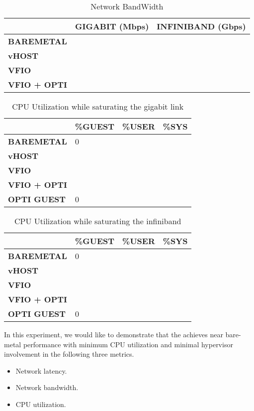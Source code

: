 \begin{table}
\begin{tabular}{|l|p{2cm}|p{2cm}|}
\hline
\textbf{} & \textbf{GIGABIT (Mbps)} & \textbf{INFINIBAND (Gbps)} \\ \hline
\textbf{BAREMETAL} & & \\ \hline
\textbf{vHOST} & & \\ \hline
\textbf{VFIO} & & \\ \hline
\textbf{VFIO + OPTI} & & \\
\hline
\end{tabular}
\caption{Network BandWidth}
\label{tab:network_bandwidth}
\end{table}

\begin{table}
\begin{tabular}{|l|l|l|l|}
\hline
\textbf{} & \textbf{\%GUEST} & \textbf{\%USER} & \textbf{\%SYS} \\ \hline
\textbf{BAREMETAL} & 0 & & \\ \hline
\textbf{vHOST} & & & \\ \hline
\textbf{VFIO} & & & \\ \hline
\textbf{VFIO + OPTI} & & & \\ \hline
\textbf{OPTI GUEST} & 0 & & \\
\hline
\end{tabular}
\caption{CPU Utilization while saturating the gigabit link}
\label{tab:cpu_utilization_1gbps}
\end{table}

\begin{table}
\begin{tabular}{|l|l|l|l|}
\hline
\textbf{} & \textbf{\%GUEST} & \textbf{\%USER} & \textbf{\%SYS} \\ \hline
\textbf{BAREMETAL} & 0 & & \\ \hline
\textbf{vHOST} & & & \\ \hline
\textbf{VFIO} & & & \\ \hline
\textbf{VFIO + OPTI} & & & \\ \hline
\textbf{OPTI GUEST} & 0 & & \\
\hline
\end{tabular}
\caption{CPU Utilization while saturating the infiniband}
\label{tab:cpu_utilization_40gbps}
\end{table}

In this experiment, we would like to demonstrate that the \na
achieves near bare-metal performance with minimum CPU
utilization and minimal hypervisor involvement in the
following three metrics.
\begin{itemize}
  \item Network latency.
  \item Network bandwidth.
  \item CPU utilization.
\end{itemize}

